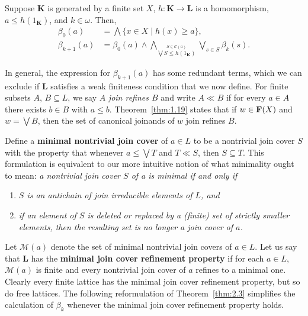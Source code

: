 \begin{theorem}\label{thm:2.3}
Suppose $\mathbf K$ is generated by a finite set $X$,
$h \colon \mathbf K \to \mathbf L$ is a homomorphism, $a \leq h(1_{\mathbf K})$, and $k\in \omega$. Then,
\begin{align*}
    \beta_0(a) &= \bigwedge \{x \in X \mid h (x) \geq a\},\\
    \beta_{k+1}(a) &= \beta_0(a) \wedge 
    \bigwedge_{\stackrel{S \in \mathcal C(a)}{\bigvee S \leq h(1_{\mathbf K})}}
    \bigvee_{s \in S} \beta_k(s).
\end{align*}
\end{theorem}
In general, the expression for $\beta_{k+1}(a)$ has some redundant terms, which we can 
exclude if $\mathbf L$ satisfies a weak finiteness condition that we now define.
For finite subsets $A$, $B \subseteq L$, we say $A$ \textit{join refines
$B$} and write $A \ll B$ if for every $a \in A$ there exists $b \in B$ 
with $a \leq b$. Theorem~\ref{thm:1.19} states that if $w \in \mathbf{F}(X)$ and 
$w = \bigvee B$, then the set of canonical joinands of $w$ join
refines $B$. 

Define a \textbf{minimal nontrivial join cover} of $a \in L$ to be a 
nontrivial join cover $S$ with the property that whenever 
$a\leq \bigvee T$ and $T \ll S$, then
$S \subseteq T$. This formulation is equivalent to our more 
intuitive notion of what minimality ought to mean: \textit{a nontrivial join cover $S$ of a is minimal 
if and only if}
\begin{enumerate}
\item \textit{$S$ is an antichain of join irreducible elements of $L$, and}
\item \textit{if an element of $S$ is deleted or replaced by a (finite) 
  set of strictly smaller elements, then the resulting set is no longer 
  a join cover of $a$.}
\end{enumerate}

Let $\mathcal M(a)$ denote the set of minimal nontrivial join covers of $a \in L$.
Let us say that $\mathbf L$ has the \textbf{minimal join cover refinement property} if for each
$a \in L$, $\mathcal M(a)$ is finite and every nontrivial join cover of $a$ refines 
to a minimal one. Clearly every finite lattice has the minimal join cover refinement 
property, but so do free lattices.  The following reformulation of Theorem~\ref{thm:2.3} 
simplifies the calculation of $\beta_k$ whenever the minimal join cover refinement property holds.

